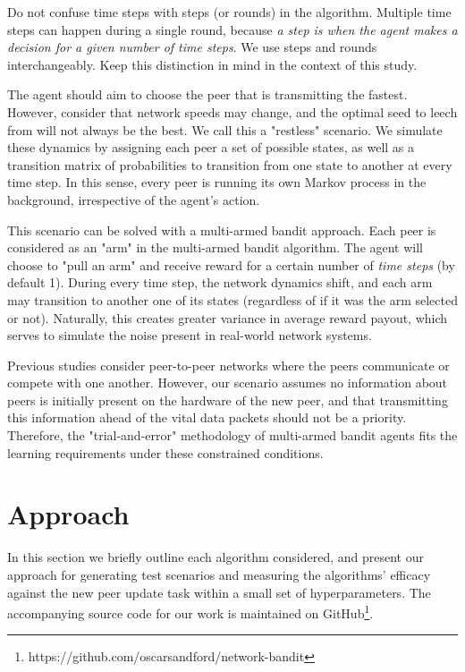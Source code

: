\documentclass{article}
\begin{document}
Do not confuse time steps with steps (or rounds) in the algorithm. Multiple time steps can happen during a single round, because \emph{a step is when the agent makes a 
decision for a given number of time steps}. We use steps and rounds interchangeably. Keep this distinction in mind in the context of this study.

The agent should aim to choose the peer that is transmitting the fastest. However, consider that network speeds may change, and the optimal seed to leech from will 
not always be the best. We call this a "restless" scenario. We simulate these dynamics by assigning each peer a set of possible states, as well as a transition matrix 
of probabilities to transition from one state to another at every time step. In this sense, every peer is running its own Markov process in the background, irrespective 
of the agent's action.

This scenario can be solved with a multi-armed bandit approach. Each peer is considered as an "arm" in the multi-armed bandit algorithm. The agent will choose to 
"pull an arm" and receive reward for a certain number of \emph{time steps} (by default 1). During every time step, the network dynamics shift, and each arm may 
transition to another one of its states (regardless of if it was the arm selected or not). Naturally, this creates greater variance in average reward payout, which 
serves to simulate the noise present in real-world network systems. 

Previous studies \cite{multiuser_mab,gossip_based_distrivuted_stochastic,p2p_offloading_with_delayed_feedback} consider peer-to-peer networks where the peers communicate 
or compete with one another. However, our scenario assumes no information about peers is initially present on the hardware of the new peer, and that transmitting this 
information ahead of the vital data packets should not be a priority. Therefore, the "trial-and-error" methodology of multi-armed bandit agents fits the learning 
requirements under these constrained conditions.


\section{Approach}

In this section we briefly outline each algorithm considered, and present our approach for generating test scenarios and measuring the algorithms' efficacy against the 
new peer update task within a small set of hyperparameters. The accompanying source code for our work is maintained on 
GitHub\footnote{https://github.com/oscarsandford/network-bandit}.
\end{document}
